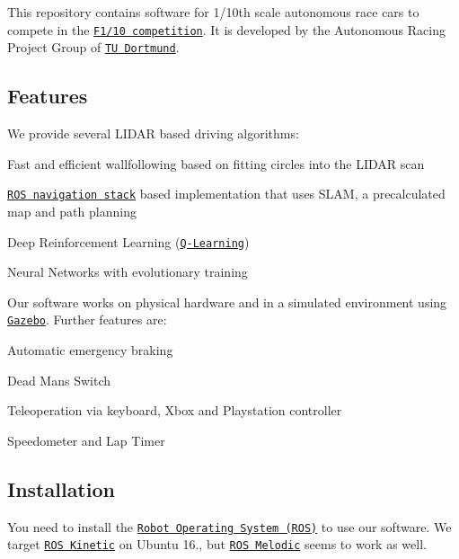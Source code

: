 \href{https://travis-ci.com/Autonomous-Racing-PG/ros.package}{\tt }

This repository contains software for 1/10th scale autonomous race cars to compete in the \href{http://f1tenth.org/}{\tt F1/10 competition}. It is developed by the Autonomous Racing Project Group of \href{https://ls12-www.cs.tu-dortmund.de/daes/}{\tt TU Dortmund}.



\subsection*{Features}

We provide several L\+I\+D\+AR based driving algorithms\+:


\begin{DoxyItemize}
\item Fast and efficient wallfollowing based on fitting circles into the L\+I\+D\+AR scan
\item \href{http://wiki.ros.org/navigation}{\tt R\+OS navigation stack} based implementation that uses S\+L\+AM, a precalculated map and path planning
\item Deep Reinforcement Learning (\href{https://en.wikipedia.org/wiki/Q-learning}{\tt Q-\/\+Learning})
\item Neural Networks with evolutionary training
\end{DoxyItemize}

Our software works on physical hardware and in a simulated environment using \href{http://gazebosim.org/}{\tt Gazebo}. Further features are\+:


\begin{DoxyItemize}
\item Automatic emergency braking
\item Dead Man\textquotesingle{}s Switch
\item Teleoperation via keyboard, Xbox and Playstation controller
\item Speedometer and Lap Timer
\end{DoxyItemize}

\subsection*{Installation}

You need to install the \href{https://www.ros.org/}{\tt Robot Operating System (R\+OS)} to use our software. We target \href{http://wiki.ros.org/kinetic/Installation}{\tt R\+OS Kinetic} on Ubuntu 16., but \href{http://wiki.ros.org/melodic/Installation}{\tt R\+OS Melodic} seems to work as well.

